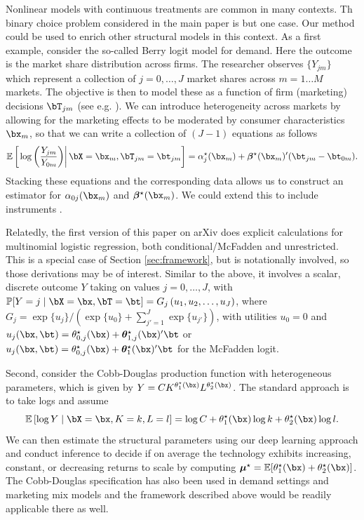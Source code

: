 \documentclass[12pt]{article}
\numberwithin{equation}{section}
\theoremstyle{definition}
\newcommand{\E}{\mathbb{E}}
\renewcommand{\P}{\mathbb{P}}
\newcommand{\bmu}{\boldsymbol{\mu}}
\newcommand{\btheta}{\boldsymbol{\theta}}
\newcommand{\bbeta}{\boldsymbol{\beta}}
\newcommand{\bmtrue}{\bmu^\star}
\newcommand{\ttrue}{\theta^\star}
\newcommand{\bttrue}{\btheta^\star}
\newcommand{\atrue}{\alpha^\star}
\newcommand{\bbtrue}{\bbeta^\star}
\begin{document}
\begin{appendices}
Nonlinear models with continuous treatments are common in many contexts. Th binary choice problem considered in the main paper is but one case. Our method could be used to enrich other structural models in this context. As a first example, consider the so-called Berry logit \citep{Berry1994_RAND} model for demand. Here the outcome is the market share distribution across firms. The researcher observes $\{Y_{jm}\}$ which represent a collection of $j=0, \ldots, J$ market shares across $m=1 \dots M$ markets. The objective is then to model these as a function of firm (marketing) decisions $\bT_{jm}$ (see e.g. \cite{Nevo2001}). We can introduce heterogeneity across markets by allowing for the marketing effects to be moderated by consumer characteristics $\bx_{m}$, so that we can write a collection of $(J-1)$ equations as follows
	\[
		\E\left[ \left. \log \left(\frac{Y_{jm}}{Y_{0m}} \right) \right| \bX = \bx_m, \bT_{jm} = \bt_{jm} \right] = \atrue_j(\bx_m) + \bbtrue(\bx_m)'(\bt_{jm} - \bt_{0m}).
	\]
Stacking these equations and the corresponding data allows us to construct an estimator for $\alpha_{0j}(\bx_m)$ and $\bbtrue(\bx_m)$. We could extend this to include instruments \citep{Okui_etal2012}. 

Relatedly, the first version of this paper on arXiv \citep{FLM2_2020_arXiv} does explicit calculations for multinomial logistic regression, both conditional/McFadden and unrestricted. This is a special case of Section \ref{sec:framework}, but is notationally involved, so those derivations may be of interest. Similar to the above, it involves a scalar, discrete outcome $Y$ taking on values $j=0, \ldots, J$, with $\P[Y = j \mid \bX = \bx, \bT = \bt] = G_j\left(u_1, u_2, \ldots, u_J \right)$, where $G_j = \exp\{u_j\} / (\exp\{u_0\} + \sum_{j'=1}^J \exp\{u_{j'}\})$, with utilities $u_0 = 0$ and $u_j(\bx, \bt) = \ttrue_{0,j}(\bx) + \bttrue_{1,j}(\bx)'\bt$ or $u_j(\bx, \bt) = \ttrue_{0,j}(\bx) + \bttrue_{1}(\bx)'\bt$ for the McFadden logit. 



Second, consider the Cobb-Douglas production function with heterogeneous parameters, which is given by $Y=CK^{\ttrue_1(\bx)}L^{\ttrue_2(\bx)}$. The standard approach is to take logs and assume 
\[
	\E\left[ \log {Y}\mid \bX = \bx, K = k,L=l \right] = \log C + \ttrue_1(\bx) \log k + \ttrue_2(\bx)\log l.
\]
We can then estimate the structural parameters using our deep learning approach and conduct inference to decide if on average the technology exhibits increasing, constant, or decreasing returns to scale by computing $\bmtrue = \E[\ttrue_1(\bx)+ \ttrue_2(\bx)]$. The Cobb-Douglas specification has also been used in demand settings and marketing mix models and the framework described above would be readily applicable there as well.





\end{appendices}
\end{document}

